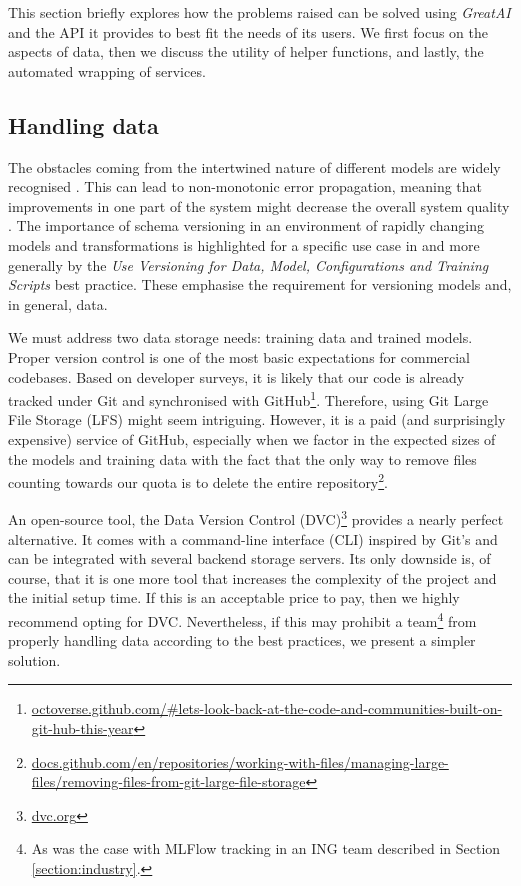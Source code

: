 This section briefly explores how the problems raised can be solved using \textit{GreatAI} and the API it provides to best fit the needs of its users. We first focus on the aspects of data, then we discuss the utility of helper functions, and lastly, the automated wrapping of services.

\subsection{Handling data} \label{subsection:large-file}

The obstacles coming from the intertwined nature of different models are widely recognised \cite{haakman2021ai,amershi2019software,sculley2015hidden}. This can lead to non-monotonic error propagation, meaning that improvements in one part of the system might decrease the overall system quality \cite{amershi2019software}. The importance of schema versioning in an environment of rapidly changing models and transformations is highlighted for a specific use case in \cite{van2017versioning} and more generally by the \textit{Use Versioning for Data, Model, Configurations and Training Scripts} best practice. These emphasise the requirement for versioning models and, in general, data.

We must address two data storage needs: training data and trained models. Proper version control is one of the most basic expectations for commercial codebases. Based on developer surveys, it is likely that our code is already tracked under Git and synchronised with GitHub\footnote{\href{https://octoverse.github.com/\#lets-look-back-at-the-code-and-communities-built-on-git-hub-this-year}{octoverse.github.com/\#lets-look-back-at-the-code-and-communities-built-on-git-hub-this-year}}. Therefore, using Git Large File Storage (LFS) might seem intriguing. However, it is a paid (and surprisingly expensive) service of GitHub, especially when we factor in the expected sizes of the models and training data with the fact that the only way to remove files counting towards our quota is to delete the entire repository\footnote{\href{https://docs.github.com/en/repositories/working-with-files/managing-large-files/removing-files-from-git-large-file-storage\#git-lfs-objects-in-your-repository}{docs.github.com/en/repositories/working-with-files/managing-large-files/removing-files-from-git-large-file-storage}}.

An open-source tool, the Data Version Control (DVC)\footnote{\href{https://dvc.org/}{dvc.org}} provides a nearly perfect alternative. It comes with a command-line interface (CLI) inspired by Git's and can be integrated with several backend storage servers. Its only downside is, of course, that it is one more tool that increases the complexity of the project and the initial setup time. If this is an acceptable price to pay, then we highly recommend opting for DVC. Nevertheless, if this may prohibit a team\footnote{As was the case with MLFlow tracking in an ING team described in Section \ref{section:industry}.} from properly handling data according to the best practices, we present a simpler solution.

